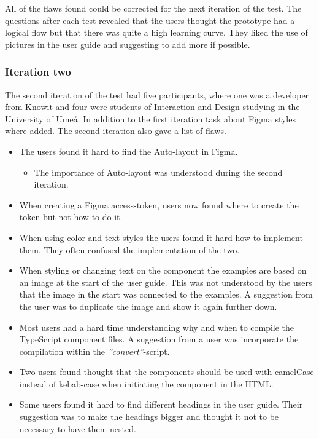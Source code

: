 All of the flaws found could be corrected for the next iteration of the test. The questions after each test revealed that the users thought the prototype had a logical flow but that there was quite a high learning curve. They liked the use of pictures in the user guide and suggesting to add more if possible.  

\subsubsection{Iteration two}%
\label{ssub:Iteration two}

The second iteration of the test had five participants, where one was a developer from Knowit and four were students of Interaction and Design studying in the University of Umeå. In addition to the first iteration task about Figma styles where added. The second iteration also gave a list of flaws.


\begin{itemize}
   \item The users found it hard to find the Auto-layout in Figma.
      \begin{itemize}
         \item The importance of Auto-layout was understood during the second iteration.
      \end{itemize}
   \item When creating a Figma access-token, users now found where to create the token but not how to do it.
   \item When using color and text styles the users found it hard how to implement them. They often confused the implementation of the two. 
   \item When styling or changing text on the component the examples are based on an image at the start of the user guide. This was not understood by the users that the image in the start was connected to the examples. A suggestion from the user was to duplicate the image and show it again further down.
   \item Most users had a hard time understanding why and when to compile the TypeScript component files. A suggestion from a user was incorporate the compilation within the \textit{''convert''}-script.
   \item Two users found thought that the components should be used with camelCase instead of kebab-case when initiating the component in the HTML.
   \item Some users found it hard to find different headings in the user guide. Their suggestion was to make the headings bigger and thought it not to be necessary to have them nested.
\end{itemize}


